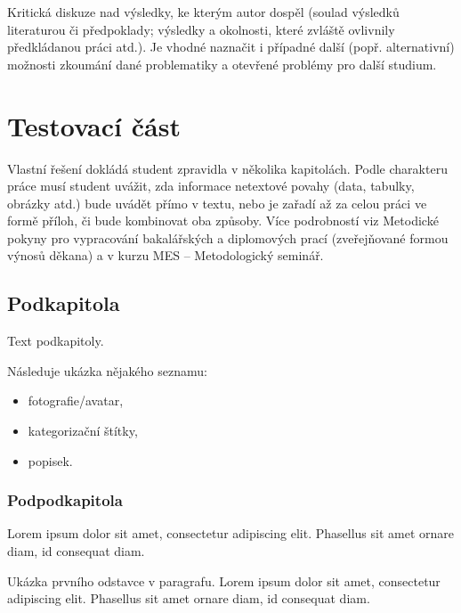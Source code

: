 
Kritická diskuze nad výsledky, ke kterým autor dospěl (soulad výsledků  literaturou či předpoklady;
výsledky a okolnosti, které zvláště ovlivnily předkládanou práci atd.). Je vhodné naznačit i případné další
(popř. alternativní) možnosti zkoumání dané problematiky a otevřené problémy pro další studium.

\section{Testovací část}


Vlastní řešení dokládá student zpravidla v několika kapitolách. Podle charakteru práce musí student uvážit, zda informace
netextové povahy (data, tabulky, obrázky atd.) bude uvádět přímo v textu, nebo je zařadí až za celou práci ve formě příloh, či bude kombinovat oba způsoby.
Více podrobností viz Metodické pokyny pro vypracování bakalářských a diplomových prací (zveřejňované formou výnosů děkana)
a v kurzu MES – Metodologický seminář.

	\subsection{Podkapitola}

	Text podkapitoly.

	Následuje ukázka nějakého seznamu:
	\begin{itemize}
		\item fotografie/avatar,
		\item kategorizační štítky,
		\item popisek.
	\end{itemize}

		\subsubsection{Podpodkapitola}

		Lorem ipsum dolor sit amet, consectetur adipiscing elit. Phasellus sit amet ornare diam, id consequat diam.


			\noindent Ukázka prvního odstavce v paragrafu. Lorem ipsum dolor sit amet, consectetur adipiscing elit. Phasellus sit amet ornare diam, id consequat diam.

